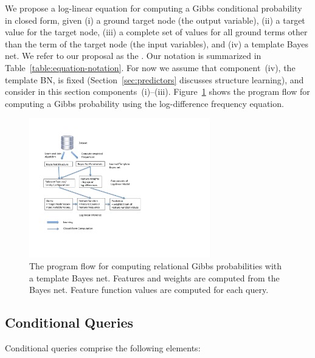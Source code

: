 \documentclass[twoside,11pt]{article}
\begin{document}
We propose a log-linear equation for computing a Gibbs conditional probability in closed form, given (i) a ground target node (the output variable), (ii) a target value for the target node, (iii) a complete set of values for all ground terms other than the term of the target node (the input variables), and (iv) a template Bayes net. We refer to our proposal as the 
. Our notation is summarized in Table~\ref{table:equation-notation}. For now we assume that component~(iv), the template BN, is fixed (Section~\ref{sec:predictors} discusses structure learning), and consider in this section components~(i)--(iii). 
Figure~\ref{fig:bn-flow} shows the program flow for computing a Gibbs probability using the log-difference frequency equation.

% 

\begin{figure}[htbp]

\begin{center}
\vspace{-2.6cm}
\includegraphics[width=0.7\textwidth]{figures/bn-regress}
\caption{The program flow for computing relational Gibbs probabilities with a template Bayes net. Features and weights are computed from the Bayes net. Feature function values are computed for each query.}
\label{fig:bn-flow}
\end{center}

\end{figure}


 \subsection{Conditional Queries} Conditional queries comprise the following elements:
 
\end{document}
